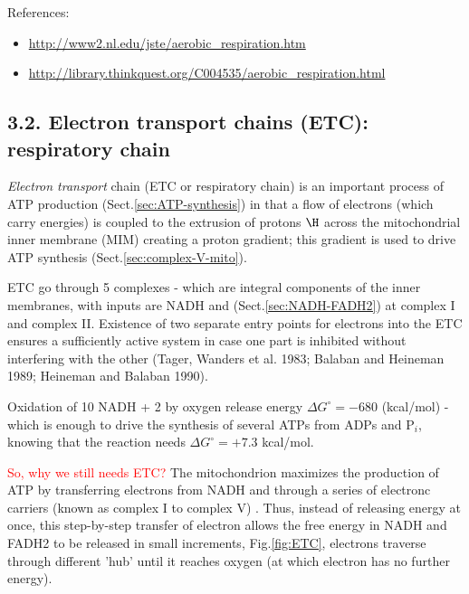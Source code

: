 References:
\begin{itemize}
\item \url{http://www2.nl.edu/jste/aerobic_respiration.htm}
\item \url{http://library.thinkquest.org/C004535/aerobic_respiration.html}
\end{itemize}

\subsection{3.2. Electron transport chains (ETC): respiratory chain}
\label{sec:mito_electron-transport-chains}
\label{sec:electron-transport-chain}
\label{sec:respiratory-chain}
\label{sec:ETC}

{\it Electron transport} chain (ETC or respiratory chain) is an important
process of ATP production (Sect.\ref{sec:ATP-synthesis}) in that a flow of
electrons (which carry energies) is coupled to the extrusion of protons $\H$
across the mitochondrial inner membrane (MIM) creating a proton gradient; this
gradient is used to drive ATP synthesis (Sect.\ref{sec:complex-V-mito}).

ETC go through 5 complexes - which are integral components of the inner
membranes, with inputs are NADH and  (Sect.\ref{sec:NADH-FADH2}) at
complex I and complex II. Existence of two separate entry points for electrons
into the ETC ensures a sufficiently active system in case one part is inhibited
without interfering with the other (Tager, Wanders et al. 1983; Balaban and
Heineman 1989; Heineman and Balaban 1990).

\begin{mdframed}
Oxidation of 10 NADH + 2  by oxygen release energy $\Delta G^\circ =
-680$ (kcal/mol) - which is enough to drive the synthesis of several ATPs from
ADPs and P$_i$, knowing that the reaction needs $\Delta G^\circ = +7.3$
kcal/mol.

\textcolor{red}{So, why we still needs ETC?}
The mitochondrion maximizes the production of ATP by transferring electrons from
NADH and  through a series of electronc carriers (known as complex I
to complex V) .
Thus, instead of releasing energy at once, this step-by-step transfer of
electron allows the free energy in NADH and FADH2 to be released in small
increments, Fig.\ref{fig:ETC}, electrons traverse through different 'hub' until
it reaches oxygen (at which electron has no further energy).

\end{mdframed}

